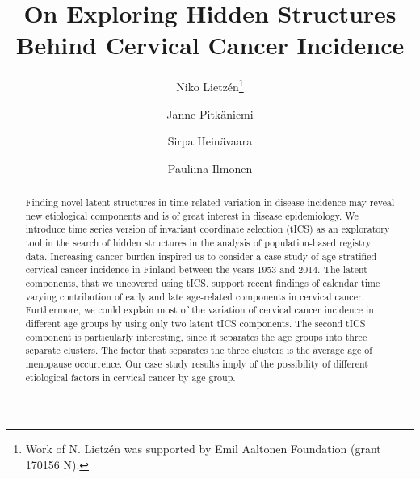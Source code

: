 \documentclass{llncs}
\begin{document}
\title{On Exploring Hidden Structures\\ Behind  Cervical Cancer Incidence}
\author{Niko Lietz\'{e}n\thanks{Work of N. Lietz\'{e}n was supported by Emil Aaltonen Foundation (grant 170156 N).}\and Janne Pitk{\"a}niemi\and Sirpa Hein{\"a}vaara \and  Pauliina Ilmonen}





\maketitle




\begin{abstract}
Finding novel latent structures in time related variation in disease incidence  may reveal new etiological components and is of great interest in disease  epidemiology. We introduce  time series version of invariant coordinate selection (tICS) as an exploratory tool in the search of hidden structures in the analysis of population-based registry data.  Increasing cancer burden inspired us to consider  a case study of age stratified cervical cancer incidence in Finland between the years 1953 and 2014. The latent components, that we uncovered using tICS, support recent findings of calendar time varying contribution of early and late age-related components in cervical cancer. Furthermore, we could explain most of the variation of cervical cancer incidence in different age groups by using only two latent tICS components. The second tICS component is particularly interesting, since it separates the age groups into three separate clusters. The factor that separates the three clusters is the average age of menopause occurrence.  Our case study results imply of the possibility of different etiological factors in cervical cancer by age group.
\end{abstract}
\end{document}
